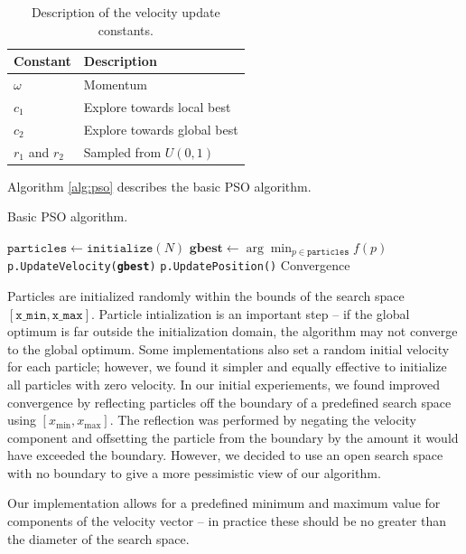 \begin{table}
  \caption{Description of the velocity update constants.}\label{tab:constants}
  \begin{tabular}{ll}\toprule
  \textbf{Constant} & \textbf{Description}\\\midrule
  $\omega$ & Momentum\\
  $c_1$ & Explore towards local best\\
  $c_2$ & Explore towards global best\\
  $r_1$ and $r_2$ & Sampled from $U(0,1)$\\\bottomrule
  \end{tabular}
\end{table}

Algorithm \ref{alg:pso} describes the basic PSO algorithm.

\begin{algorithm}
  \caption{Basic PSO algorithm.}\label{alg:pso}
  \begin{algorithmic}[1]
    \State $\texttt{particles} \gets \texttt{initialize}(N)$
    \Repeat
    \State $\textbf{gbest} \gets \arg\min_{p\in\texttt{particles}}f(p)$
    \State \texttt{p.UpdateVelocity(\textbf{gbest})}
    \State \texttt{p.UpdatePosition()}
    \EndFor
    \Until Convergence
    \EndProcedure
  \end{algorithmic}
\end{algorithm}

Particles are initialized randomly within the bounds of the search space
$[\texttt{x\_min}, \texttt{x\_max}]$. Particle intialization is an important
step -- if the global optimum is far outside the initialization domain, the
algorithm may not converge to the global optimum.
Some implementations also set a random
initial velocity for each particle; however, we found it simpler and equally
effective to initialize all particles with zero velocity. In our initial
experiements, we found improved convergence by reflecting particles off the
boundary of a predefined search space using $[x_{\min}, x_{\max}]$. The
reflection was performed by negating the velocity component and offsetting the
particle from the boundary by the amount it would have exceeded the boundary.
However, we decided to use an open search space with no boundary to give a more
pessimistic view of our algorithm.

Our implementation allows for a predefined minimum and maximum value for
components of the velocity vector -- in practice these should be no greater than
the diameter of the search space.


